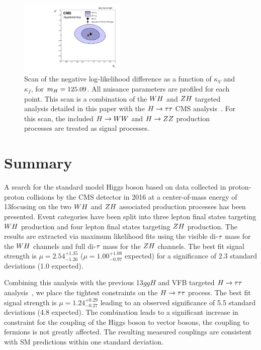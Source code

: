 \begin{figure}[!ht]
 \begin{center}
  \includegraphics[width=0.45\textwidth]{higgs_to_taus_vh/plots/combined/kFkV_HIG-18-007_plus_HIG-16-043.pdf}
 \end{center}
 \caption{Scan of the negative 
 log-likelihood difference as a function of $\kappa_V$ and $\kappa_f$, for 
 $m_{H} = 125.09$\GeV.  All nuisance parameters are profiled for each point. 
 This scan is a combination of the $WH$ and $ZH$ targeted analysis detailed in this paper
 with the $H\to\tau\tau$ CMS analysis~\cite{HIG-16-043}.
 For this scan, the included $H\to WW$ and $H\to ZZ$ production processes 
 are treated as signal processes.
 }
 \label{fig:kVkf}
\end{figure}



\section{Summary}
A search for the standard model Higgs boson based on data collected in proton-proton collisions by the
CMS detector in 2016 at a center-of-mass energy of 13\TeV focusing on the
two $WH$ and $ZH$ associated production processes has been presented. Event
categories have been split into three lepton final states targeting $WH$ production
and four lepton final states targeting $ZH$ production. The results are extracted
via maximum likelihood fits using the visible di-$\tau$ mass for the $WH$
channels and full di-$\tau$ mass for the $ZH$ channels. 
The best fit signal
strength is $\mu = 2.54 ^{+1.35} _{-1.26}$ ($\mu = 1.00 ^{+1.08} _{-0.97}$ expected) 
for a significance of 2.3 standard deviations (1.0 expected).

Combining this analysis with the previous 13\TeV $ggH$ and VFB targeted $H\to\tau\tau$ 
analysis~\cite{HIG-16-043}, we place the tightest constraints
on the $H\to\tau\tau$ process. 
The best fit signal strength is $\mu = 1.24 ^{+0.29} _{-0.27}$ leading to an
observed significance of 5.5 standard deviations (4.8 expected). 
The combination leads to a significant increase in constraint for the coupling
of the Higgs boson to vector bosons, the coupling to fermions is not greatly
affected. The resulting measured couplings are consistent with SM predictions
within one standard deviation.

